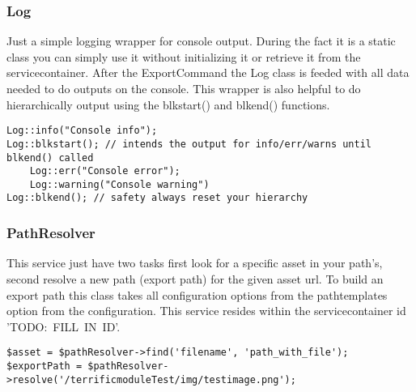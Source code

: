 \noindent
\begin{minipage}{\textwidth}
\vspace{1.5em}
\subsubsection{Log}
Just a simple logging wrapper for console output. During the fact it is a static class you can simply use it without initializing it or retrieve it from the servicecontainer. After the ExportCommand the Log class is feeded with all data needed to do outputs on the console. This wrapper is also helpful to do hierarchically output using the blkstart() and blkend() functions.

\begin{verbatim}
Log::info("Console info");
Log::blkstart(); // intends the output for info/err/warns until blkend() called
    Log::err("Console error");
    Log::warning("Console warning")
Log::blkend(); // safety always reset your hierarchy
\end{verbatim}
\end{minipage}

\noindent
\begin{minipage}{\textwidth}
\vspace{1.5em}
\subsubsection{PathResolver}
This service just have two tasks first look for a specific asset in your path's, second resolve a new path (export path) for the given asset url. To build an export path this class takes all configuration options from the pathtemplates option from the configuration. This service resides within the servicecontainer id \mbox{'TODO: FILL IN ID'}.

\begin{verbatim}
$asset = $pathResolver->find('filename', 'path_with_file');
$exportPath = $pathResolver->resolve('/terrificmoduleTest/img/testimage.png');
\end{verbatim}
\end{minipage}

